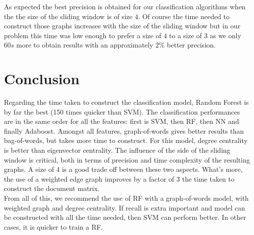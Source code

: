 \documentclass[11pt,a4paper]{article}
\begin{document}
As expected the best precision is obtained for our classification algorithms when the the size of the sliding window is of size $4$. Of course the time needed to construct those graphs increases with the size of the sliding window but in our problem this time was low enough to prefer a size of $4$ to a size of $3$ as we only $60s$ more to obtain results with an approximately $2\%$ better precision.

\section{Conclusion}
Regarding the time taken to construct the classification model, Random Forest is by far the best (150 times quicker than SVM). The classification performances are in the same order for all the features: first is SVM, then RF, then NN and finally Adaboost. Amongst all features, graph-of-words gives better results than bag-of-words, but takes more time to construct. For this model, degree centrality is better than eigenvector centrality. The influence of the side of the sliding window is critical, both in terms of precision and time complexity of the resulting graphs. A size of 4 is a good trade off between these two aspects. What's more, the use of a weighted edge graph improves by a factor of 3 the time taken to construct the document matrix.
\\From all of this, we recommend the use of RF with a graph-of-words model, with weighted graph and degree centrality. If recall is extra important and model can be constructed with all the time needed, then SVM can perform better. In other cases, it is quicker to train a RF.
\end{document}
